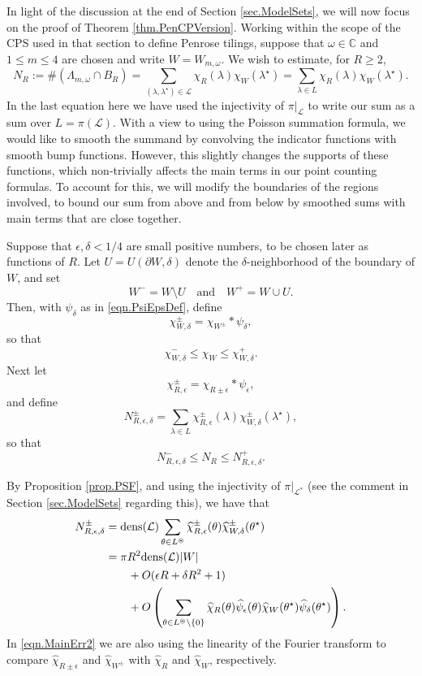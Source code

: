 \documentclass[reqno]{amsart}
\newcommand{\C}{\mathbb{C}}
\newcommand{\mc}{\mathcal}
\newcommand{\mr}{\mathrm}
\newcommand{\cL}{\mathcal{L}}
\begin{document}
In light of the discussion at the end of Section \ref{sec.ModelSets}, we will now focus on the proof of Theorem \ref{thm.PenCPVersion}. Working within the scope of the CPS used in that section to define Penrose tilings, suppose that $\omega\in\C$ and $1\le m\le 4$ are chosen and write $W=W_{m,\omega}$. We wish to estimate, for $R\ge 2$,
\[N_R:=\#\left(\Lambda_{m,\omega}\cap B_R\right)=\sum_{(\lambda,\lambda^\star)\in\mc{L}}\chi_R(\lambda)\chi_W(\lambda^\star)=\sum_{\lambda\in L}\chi_R(\lambda)\chi_W(\lambda^\star).\]
In the last equation here we have used the injectivity of $\pi|_\cL$ to write our sum as a sum over $L=\pi(\cL).$ With a view to using the Poisson summation formula, we would like to smooth the summand by convolving the indicator functions with smooth bump functions. However, this slightly changes the supports of these functions, which non-trivially affects the main terms in our point counting formulas. To account for this, we will modify the boundaries of the regions involved, to bound our sum from above and from below by smoothed sums with main terms that are close together.

Suppose that $\epsilon, \delta<1/4$ are small positive numbers, to be chosen later as functions of $R$. Let $U=U(\partial W,\delta)$ denote the $\delta$-neighborhood of the boundary of $W$, and set
\[W^-=W\setminus U\quad\text{and}\quad W^+=W\cup U.\]
Then, with $\psi_{\delta}$ as in \eqref{eqn.PsiEpsDef}, define
\[\chi_{W,\delta}^\pm=\chi_{W^\pm}\ast\psi_{\delta},\]
so that
\[\chi_{W,\delta}^-\le \chi_W\le \chi_{W,\delta}^+.\]
Next let
\[\chi_{R,\epsilon}^\pm=\chi_{R\pm\epsilon}\ast\psi_\epsilon,\]
and define
\[N_{R,\epsilon,\delta}^\pm = \sum_{\lambda\in L}\chi_{R,\epsilon}^\pm(\lambda)\chi_{W,\delta}^\pm(\lambda^\star),\]
so that
\begin{equation}\label{eqn.Thm4PtCnt1}
N_{R,\epsilon,\delta}^-\le N_R\le N_{R,\epsilon,\delta}^+.
\end{equation}


By Proposition \ref{prop.PSF}, and using the injectivity of $\pi|_{\cL^*}$ (see the comment in Section \ref{sec.ModelSets} regarding this), we have that
\begin{align}
	N_{R,\epsilon,\delta}^\pm&=\mr{dens}(\cL)\sum_{\theta\in L^\circledast}\widehat{\chi}_{R,\epsilon}^\pm(\theta)\widehat{\chi}_{W,\delta}^\pm(\theta^\star)\nonumber\\
	&=\pi R^2\mr{dens}(\cL)|W|\nonumber\\
	&\hspace*{20bp}+O(\epsilon R+\delta R^2 + 1)\label{eqn.MainErr1}\\
	&\hspace*{20bp}+O\left(\sum_{\theta\in L^\circledast\setminus\{0\}}\widehat{\chi}_R(\theta)\widehat{\psi}_{\epsilon}(\theta)\widehat{\chi}_{W}(\theta^\star)\widehat{\psi}_\delta(\theta^\star)\right).\label{eqn.MainErr2}
\end{align}
In \eqref{eqn.MainErr2} we are also using the linearity of the Fourier transform to compare $\widehat{\chi}_{R\pm\epsilon}$ and $\widehat{\chi}_{W^\pm}$ with $\widehat{\chi}_{R}$ and $\widehat{\chi}_{W}$, respectively. 
\end{document}
